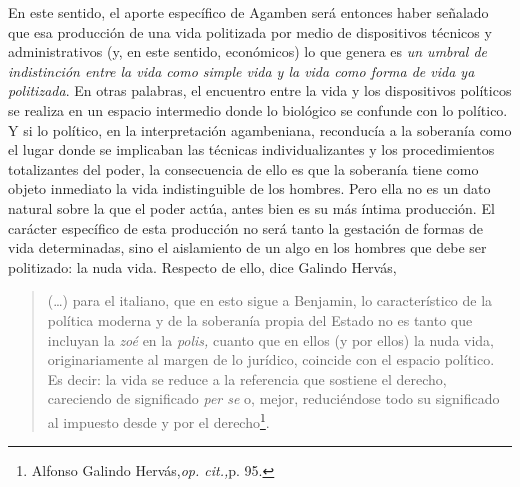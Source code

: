 En este sentido, el aporte específico de Agamben será entonces haber señalado que esa producción de una vida politizada por medio de dispositivos técnicos y administrativos (y, en este sentido, económicos) lo que genera es \emph{un umbral de indistinción entre la vida como simple vida y la vida como forma de vida ya politizada}. En otras palabras, el encuentro entre la vida y los dispositivos políticos se realiza en un espacio intermedio donde lo biológico se confunde con lo político. Y si lo político, en la interpretación agambeniana, reconducía a la soberanía como el lugar donde se implicaban las técnicas individualizantes y los procedimientos totalizantes del poder, la consecuencia de ello es que la soberanía tiene como objeto inmediato la vida indistinguible de los hombres. Pero ella no es un dato natural sobre la que el poder actúa, antes bien es su más íntima producción. El carácter específico de esta producción no será tanto la gestación de formas de vida determinadas, sino el aislamiento de un algo en los hombres que debe ser politizado: la nuda vida. Respecto de ello, dice Galindo Hervás,

\begin{quote}
(\dots) para el italiano, que en esto sigue a Benjamin, lo característico de la política moderna y de la soberanía propia del Estado no es tanto que incluyan la \emph{zoé} en la \emph{polis,} cuanto que en ellos (y por ellos) la nuda vida, originariamente al margen de lo jurídico, coincide con el espacio político. Es decir: la vida se reduce a la referencia que sostiene el derecho, careciendo de significado \emph{per se} o, mejor, reduciéndose todo su significado al impuesto desde y por el derecho\footnote{Alfonso Galindo Hervás,\emph{op. cit.,}p. 95.}.
\end{quote}

